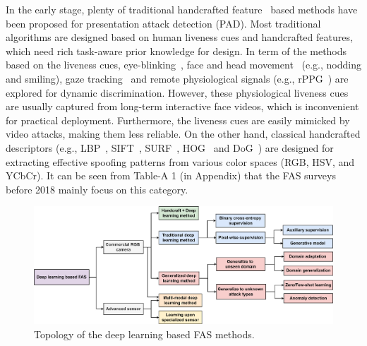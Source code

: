 \documentclass[10pt,journal,compsoc]{IEEEtran}
\begin{document}
In the early stage, plenty of traditional handcrafted feature~\cite{pan2007eye,li2016generalized,Pereira2012LBP,Komulainen2014Context,Patel2016Secure} based methods have been proposed for presentation attack detection (PAD). Most traditional algorithms are designed based on human liveness cues and handcrafted features, which need rich task-aware prior knowledge for design. In term of the methods based on the liveness cues, eye-blinking~\cite{pan2007eye,jee2006liveness,li2008eye}, face and head movement~\cite{wang2009face,bao2009liveness} (e.g., nodding and smiling), gaze tracking~\cite{bigun2004assuring,ali2012liveness} and remote physiological signals (e.g., rPPG~\cite{li2016generalized,Liu2018Learning,lin2019face,yu2019remote1}) are explored for dynamic discrimination. However, these physiological liveness cues are usually captured from long-term interactive face videos, which is inconvenient for practical deployment. Furthermore, the liveness cues are easily mimicked by video attacks, making them less reliable. On the other hand, classical handcrafted descriptors (e.g., LBP~\cite{boulkenafet2015face,Pereira2012LBP}, 
SIFT~\cite{Patel2016Secure}, SURF~\cite{boulkenafet2016face2}, HOG~\cite{Komulainen2014Context} and DoG~\cite{tan2010face}) are designed for extracting effective spoofing patterns from various color spaces (RGB, HSV, and YCbCr). It can be seen from Table-A 1 (in Appendix) that the FAS surveys before 2018 mainly focus on this category. 




\begin{figure}[t]
\centering
\includegraphics[scale=0.39]{Figures/Topology.png}
  \caption{ 
  Topology of the deep learning based FAS methods.}
\label{fig:topology}
\vspace{-1.0em}
\end{figure}
\end{document}
